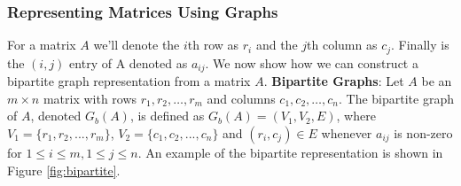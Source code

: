 	\subsubsection*{Representing Matrices Using Graphs}
	For a matrix $A$ we'll denote the $i$th row as $r_i$ and the $j$th column
	as $c_j$. Finally is the $(i,j)$ entry of A denoted as $a_{ij}$. We now show how
	we can
	construct a bipartite graph representation from a matrix $A$. \newline 
	\textbf{Bipartite Graphs}: Let $A$ be an $m \times n$ matrix with rows $r_1,
	r_2, \dots, r_m$ and columns $c_1, c_2, \dots, c_n$. The bipartite graph of $A$,
	denoted $G_b(A)$, is defined as $G_b(A) = (V_1, V_2, E)$, where $V_1 = \{r_1,
	r_2, ..., r_m\}$, $V_2 = \{c_1, c_2, ..., c_n\}$ and $(r_i, c_j) \in E$ whenever
	$a_{ij}$ is non-zero for $1 \leq i \leq m, 1 \leq j \leq n$.  An example of the
	bipartite representation is shown in Figure \ref{fig:bipartite}. 
